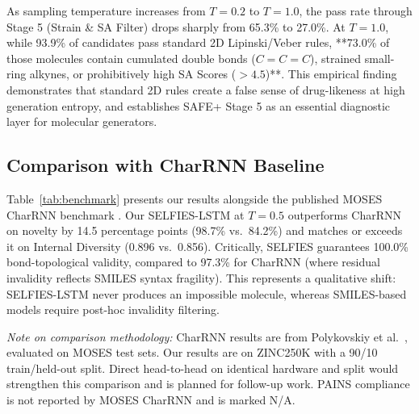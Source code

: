 \documentclass[conference]{IEEEtran}
\begin{document}
As sampling temperature increases from $T{=}0.2$ to $T{=}1.0$, the pass rate through Stage 5 (Strain \& SA Filter) drops sharply from 65.3\% to 27.0\%. At $T{=}1.0$, while 93.9\% of candidates pass standard 2D Lipinski/Veber rules, **73.0\% of those molecules contain cumulated double bonds ($C{=}C{=}C$), strained small-ring alkynes, or prohibitively high SA Scores ($>4.5$)**. This empirical finding demonstrates that standard 2D rules create a false sense of drug-likeness at high generation entropy, and establishes SAFE+ Stage 5 as an essential diagnostic layer for molecular generators.

\subsection{Comparison with CharRNN Baseline}

Table~\ref{tab:benchmark} presents our results alongside the published MOSES CharRNN benchmark \cite{ref11}. Our SELFIES-LSTM at $T{=}0.5$ outperforms CharRNN on novelty by 14.5 percentage points (98.7\% vs.\ 84.2\%) and matches or exceeds it on Internal Diversity (0.896 vs.\ 0.856). Critically, SELFIES guarantees 100.0\% bond-topological validity, compared to 97.3\% for CharRNN (where residual invalidity reflects SMILES syntax fragility). This represents a qualitative shift: SELFIES-LSTM never produces an impossible molecule, whereas SMILES-based models require post-hoc invalidity filtering.

\textit{Note on comparison methodology:} CharRNN results are from Polykovskiy et al.\ \cite{ref11}, evaluated on MOSES test sets. Our results are on ZINC250K with a 90/10 train/held-out split. Direct head-to-head on identical hardware and split would strengthen this comparison and is planned for follow-up work. PAINS compliance is not reported by MOSES CharRNN and is marked N/A.
\end{document}
